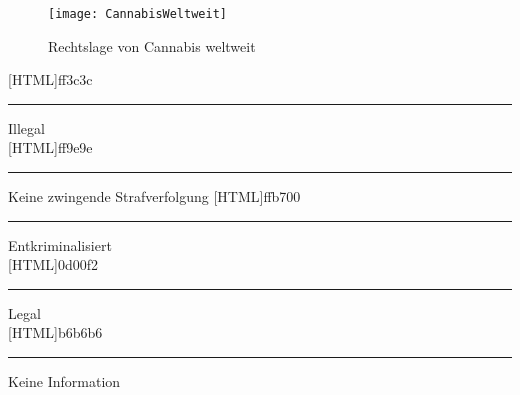 \documentclass[../main.tex]{subfiles}
\begin{document}
	 \noindent
	 \begin{figure}[H]
	 	\centering
	 	\texttt{[image: CannabisWeltweit]}
	 	\captionsetup{font=small}
	 	\caption[Rechtslage von Cannabis weltweit]{Rechtslage von Cannabis weltweit\protect\footnotemark}
	 	\label{fig:worldwide}
	 \end{figure}
	 
	 \begin{minipage}[t]{0.4\textwidth}
	 	[HTML]{ff3c3c}{\rule{0pt}{6pt}\rule{6pt}{0pt}}\quad Illegal\\
	 	[HTML]{ff9e9e}{\rule{0pt}{6pt}\rule{6pt}{0pt}}\quad Keine zwingende Strafverfolgung
	 	[HTML]{ffb700}{\rule{0pt}{6pt}\rule{6pt}{0pt}}\quad Entkriminalisiert\\
	 	[HTML]{0d00f2}{\rule{0pt}{6pt}\rule{6pt}{0pt}}\quad Legal\\
	 	[HTML]{b6b6b6}{\rule{0pt}{6pt}\rule{6pt}{0pt}}\quad Keine Information\\
	 \end{minipage}
	 
	 
\end{document}
